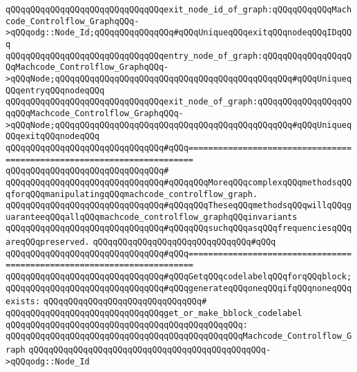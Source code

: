 \verb|qQQqqQQqqQQqqQQqqQQqqQQqqQQqqQQqexit_node_id_of_graph:qQQqqQQqqQQqMachcode_Controlflow_GraphqQQq->qQQqodg::Node_Id;qQQqqQQqqQQqqQQq#qQQqUniqueqQQqexitqQQqnodeqQQqIDqQQq|\newline
\verb|qQQqqQQqqQQqqQQqqQQqqQQqqQQqqQQqentry_node_of_graph:qQQqqQQqqQQqqQQqqQQqMachcode_Controlflow_GraphqQQq->qQQqNode;qQQqqQQqqQQqqQQqqQQqqQQqqQQqqQQqqQQqqQQqqQQqqQQq#qQQqUniqueqQQqentryqQQqnodeqQQq|\newline
\verb|qQQqqQQqqQQqqQQqqQQqqQQqqQQqqQQqexit_node_of_graph:qQQqqQQqqQQqqQQqqQQqqQQqMachcode_Controlflow_GraphqQQq->qQQqNode;qQQqqQQqqQQqqQQqqQQqqQQqqQQqqQQqqQQqqQQqqQQqqQQq#qQQqUniqueqQQqexitqQQqnodeqQQq|\newline
\newline
\verb|qQQqqQQqqQQqqQQqqQQqqQQqqQQqqQQq#qQQq=======================================================================|\newline
\verb|qQQqqQQqqQQqqQQqqQQqqQQqqQQqqQQq#|\newline
\verb|qQQqqQQqqQQqqQQqqQQqqQQqqQQqqQQq#qQQqqQQqMoreqQQqcomplexqQQqmethodsqQQqforqQQqmanipulatingqQQqmachcode_controlflow_graph.|\newline
\verb|qQQqqQQqqQQqqQQqqQQqqQQqqQQqqQQq#qQQqqQQqTheseqQQqmethodsqQQqwillqQQqguaranteeqQQqallqQQqmachcode_controlflow_graphqQQqinvariants|\newline
\verb|qQQqqQQqqQQqqQQqqQQqqQQqqQQqqQQq#qQQqqQQqsuchqQQqasqQQqfrequenciesqQQqareqQQqpreserved.|\newline
\verb|qQQqqQQqqQQqqQQqqQQqqQQqqQQqqQQq#qQQq|\newline
\verb|qQQqqQQqqQQqqQQqqQQqqQQqqQQqqQQq#qQQq=======================================================================|\newline
\newline
\verb|qQQqqQQqqQQqqQQqqQQqqQQqqQQqqQQq#qQQqGetqQQqcodelabelqQQqforqQQqblock;|\newline
\verb|qQQqqQQqqQQqqQQqqQQqqQQqqQQqqQQq#qQQqgenerateqQQqoneqQQqifqQQqnoneqQQqexists:|\newline
\verb|qQQqqQQqqQQqqQQqqQQqqQQqqQQqqQQq#|\newline
\verb|qQQqqQQqqQQqqQQqqQQqqQQqqQQqqQQqget_or_make_bblock_codelabel|\newline
\verb|qQQqqQQqqQQqqQQqqQQqqQQqqQQqqQQqqQQqqQQqqQQqqQQq:|\newline
\verb|qQQqqQQqqQQqqQQqqQQqqQQqqQQqqQQqqQQqqQQqqQQqqQQqMachcode_Controlflow_Graph|\newline
\verb|qQQqqQQqqQQqqQQqqQQqqQQqqQQqqQQqqQQqqQQqqQQqqQQq->qQQqodg::Node_Id|\newline
